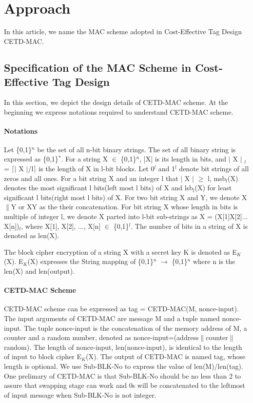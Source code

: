 \documentclass{article}
\begin{document}
\section{Approach}
In this article, we name the MAC scheme adopted in Cost-Effective Tag Design\cite{} CETD-MAC. 
\subsection{Specification of the MAC Scheme in Cost-Effective Tag Design}
In this section, we depict the design details of CETD-MAC scheme. At the beginning we express notations required to understand CETD-MAC scheme. 
\paragraph{Notations}
Let \{0,1\}$^n$ be the set of all n-bit binary strings. The set of all binary string is expressed as \{0,1\}$^*$.  
For a string X $\in$ \{0,1\}$^n$, |X| is its length in bits, and $\vert$ X $\vert$ $_l$ = $\lceil$$\vert$ X $\vert$/l$\rceil$ is the length of X in l-bit blocks.  Let 0$^l$ and 1$^l$ denote bit strings of all zeros and all ones. 
For a bit string X and an integer l that $\vert$ X $\vert$ $\geq$ l, msb$_l$(X) denotes the most significant l bits(left most l bits) of X and lsb$_l$(X) for least significant l bits(right most l bits) of X.
For two bit string X and Y, we denote X$\|$Y  or XY as the their concatenation. For bit string X whose length in bits is multiple of integer l, we denote X parted into l-bit sub-strings as X = (X[1]X[2]$\ldots$X[n])$_l$, where X[1], X[2], $\ldots$, X[n] $\in$ \{0,1\}$^l$.
The number of bits in a string of X is denoted as len(X).

The block cipher encryption of a string X with a secret key K is denoted as E$_K$(X). E$_K$(X) expresses the String mapping of \{0,1\}$^n$ $\rightarrow$ \{0,1\}$^n$ where n is the len(X) and len(output).
\paragraph{CETD-MAC Scheme}
CETD-MAC scheme can be expressed as tag = CETD-MAC(M, nonce-input). The input arguments of CETD-MAC are message M and a tuple named nonce-input. The tuple nonce-input is the concatenation of the memory address of M, a counter and a random number, denoted as nonce-input=(address$\|$counter$\|$random). The length of nonce-input, len(nonce-input), is identical to the length of input to block cipher E$_K$(X). The output of CETD-MAC is named tag, whose length is optional. We use Sub-BLK-No to express the value of  len(M)/len(tag). One prelimary of CETD-MAC is that Sub-BLK-No should be no less than 2 to assure that swapping stage can work and 0s will be concatenated to the leftmost of input message when Sub-BLK-No is not integer.  
\end{document}
